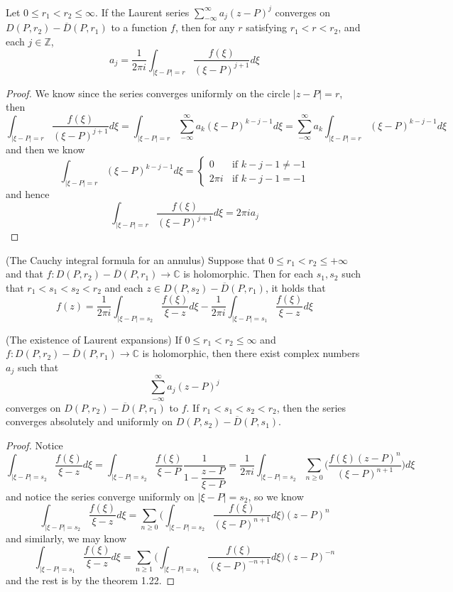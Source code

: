 \documentclass[lang=en, color=blue, ]{elegantbook}
\newcommand{\Z}{\mathbb{Z}}
\newcommand{\C}{\mathbb{C}}
\begin{document}
\begin{proposition}
    Let $0\leq r_1<r_2\leq \infty$. If  the Laurent series $\sum\limits_{-\infty}^{\infty}a_j(z-P)^j$ converges on $D(P,r_2)-\overline{D}(P,r_1)$ to a function $f$, then for any $r$ satisfying $r_1<r<r_2$, and each $j\in\Z$,
    \[a_j = \dfrac{1}{2\pi i }\int_{|\xi-P|=r}\dfrac{f(\xi)}{(\xi-P)^{j+1}}d\xi\]
\end{proposition}
\begin{proof}\par
    We know since the series converges uniformly on the circle $|z-P| = r$, then
    \[
    \int_{|\xi-P| = r} \dfrac{f(\xi)}{(\xi-P)^{j+1}}d\xi = \int_{|\xi-P|=r} \sum\limits_{-\infty}^{\infty} a_k(\xi-P)^{k-j-1} d\xi = \sum\limits_{-\infty}^{\infty} a_k\int_{|\xi-P|=r} (\xi-P)^{k-j-1} d\xi 
    \]
    and then we know
    \[
    \int_{|\xi-P|=r}(\xi-P)^{k-j-1}d\xi = \begin{cases}
        0\quad&\text{if }k-j-1\neq -1 \\
        2\pi i&\text{if }k-j-1 = -1
    \end{cases}
    \]
    and hence
    \[
    \int_{|\xi-P| = r} \dfrac{f(\xi)}{(\xi-P)^{j+1}}d\xi = 2\pi ia_j
    \]
\end{proof}

\begin{theorem}
    (The Cauchy integral formula for an annulus) Suppose that $0\leq r_1<r_2\leq +\infty$ and that $f:D(P,r_2)-\overline{D}(P,r_1)\to\C$ is holomorphic. Then for each $s_1,s_2$ such that $r_1<s_1<s_2<r_2$ and each $z \in D(P,s_2)-\overline{D}(P,r_1)$, it holds that
    \[
    f(z) = \dfrac{1}{2\pi i }\int_{|\xi-P|=s_2}\dfrac{f(\xi)}{\xi-z}d\xi - \dfrac{1}{2\pi i}\int_{|\xi-P|=s_1}\dfrac{f(\xi)}{\xi-z}d\xi
    \] 
\end{theorem}

\begin{theorem}
    (The existence of Laurent expansions) If $0\leq r_1<r_2\leq \infty$ and $f:D(P,r_2)-\overline{D}(P,r_1)\to\C$ is holomorphic, then there exist complex numbers $a_j$ such that
    \[
    \sum_{-\infty}^{\infty} a_j(z-P)^j
    \]
    converges on $D(P,r_2)-\overline{D}(P,r_1)$ to $f$. If $r_1<s_1<s_2<r_2$, then the series converges absolutely and uniformly on $D(P,s_2)-\overline{D}(P,s_1)$.
\end{theorem}
\begin{proof}\par
    Notice
    \[
    \int_{|\xi-P|=s_2}\dfrac{f(\xi)}{\xi-z}d\xi = \int_{|\xi-P|=s_2}\dfrac{f(\xi)}{\xi-P}\dfrac{1}{1-\dfrac{z-P}{\xi-P}} = \dfrac{1}{2\pi i }\int_{|\xi-P|=s_2}\sum_{n\geq 0}\Big(\dfrac{f(\xi)(z-P)^n}{(\xi-P)^{n+1}}\Big)d\xi
    \]
    and notice the series converge uniformly on $|\xi-P|=s_2$, so we know
    \[
    \int_{|\xi-P|=s_2}\dfrac{f(\xi)}{\xi-z}d\xi = \sum_{n\geq 0}\Big(\int_{|\xi-P|=s_2}\dfrac{f(\xi)}{(\xi-P)^{n+1}}d\xi\Big)(z-P)^n
    \]
    and similarly, we may know
    \[
     \int_{|\xi-P|=s_1}\dfrac{f(\xi)}{\xi-z}d\xi = 
    \sum_{n\geq 1}\Big(\int_{|\xi-P|=s_1}\dfrac{f(\xi)}{(\xi-P)^{-n+1}}d\xi\Big)(z-P)^{-n}
    \]
    and the rest is by the theorem 1.22.
\end{proof}
\end{document}

